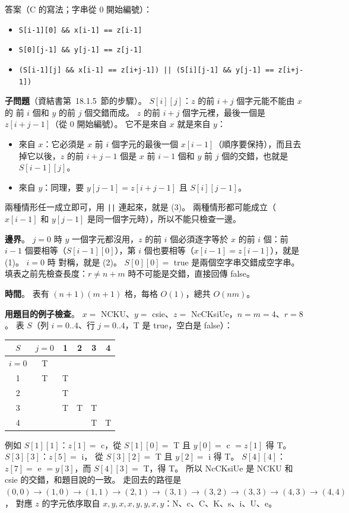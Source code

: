 \begin{pastsoln}
答案（C 的寫法；字串從 $0$ 開始編號）：
\begin{itemize}
\item[(1)] \texttt{S[i-1][0] \&\& x[i-1] == z[i-1]}
\item[(2)] \texttt{S[0][j-1] \&\& y[j-1] == z[j-1]}
\item[(3)] \texttt{(S[i-1][j] \&\& x[i-1] == z[i+j-1]) || (S[i][j-1] \&\& y[j-1] == z[i+j-1])}
\end{itemize}

\textbf{子問題}（資結書第~18.1.5~節的步驟）。 $S[i][j]$：$z$ 的前 $i + j$ 個字元能不能由 $x$ 的
前 $i$ 個和 $y$ 的前 $j$ 個交錯而成。 $z$ 的前 $i + j$ 個字元裡，最後一個是 $z[i+j-1]$（從 $0$
開始編號）。 它不是來自 $x$ 就是來自 $y$：
\begin{itemize}
\item 來自 $x$：它必須是 $x$ 前 $i$ 個字元的最後一個 $x[i-1]$（順序要保持），而且去掉它以後，$z$
的前 $i + j - 1$ 個是 $x$ 前 $i - 1$ 個和 $y$ 前 $j$ 個的交錯，也就是 $S[i-1][j]$。
\item 來自 $y$：同理，要 $y[j-1] = z[i+j-1]$ 且 $S[i][j-1]$。
\end{itemize}
兩種情形任一成立即可，用 \texttt{||} 連起來，就是 (3)。 兩種情形都可能成立（$x[i-1]$ 和
$y[j-1]$ 是同一個字元時），所以不能只檢查一邊。

\textbf{邊界}。 $j = 0$ 時 $y$ 一個字元都沒用，$z$ 的前 $i$ 個必須逐字等於 $x$ 的前 $i$ 個：前
$i - 1$ 個要相等（$S[i-1][0]$），第 $i$ 個也要相等（$x[i-1] = z[i-1]$），就是 (1)。 $i = 0$ 時
對稱，就是 (2)。 $S[0][0] = $ true 是兩個空字串交錯成空字串。 填表之前先檢查長度：$r \ne n + m$
時不可能是交錯，直接回傳 false。

\textbf{時間}。 表有 $(n+1)(m+1)$ 格，每格 $O(1)$，總共 $O(nm)$。

\textbf{用題目的例子檢查}。 $x = $ NCKU、$y = $ csie、$z = $ NcCKsiUe，$n = m = 4$、$r = 8$。 表
$S$（列 $i = 0..4$、行 $j = 0..4$，T 是 true，空白是 false）：
\begin{center}
\small
\begin{tabular}{c|ccccc}
$S$ & $j{=}0$ & 1 & 2 & 3 & 4 \\ \hline
$i{=}0$ & T & & & & \\
1 & T & T & & & \\
2 & & T & & & \\
3 & & T & T & T & \\
4 & & & & T & T \\
\end{tabular}
\end{center}
例如 $S[1][1]$：$z[1] = $ c，從 $S[1][0] = $ T 且 $y[0] = $ c $= z[1]$ 得 T。 $S[3][3]$：$z[5] = $ i，
從 $S[3][2] = $ T 且 $y[2] = $ i 得 T。 $S[4][4]$：$z[7] = $ e $= y[3]$，而 $S[4][3] = $ T，得 T。
所以 NcCKsiUe 是 NCKU 和 csie 的交錯，和題目說的一致。 走回去的路徑是
$(0,0) \to (1,0) \to (1,1) \to (2,1) \to (3,1) \to (3,2) \to (3,3) \to (4,3) \to (4,4)$，
對應 $z$ 的字元依序取自 $x, y, x, x, y, y, x, y$：N、c、C、K、s、i、U、e。
\end{pastsoln}
